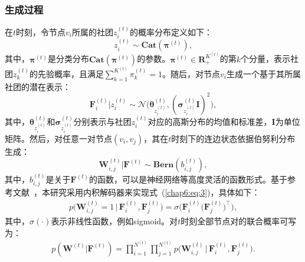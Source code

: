 \subsubsection{生成过程}


在$t$时刻，令节点$v_i$所属的社团$z_i^{(t)}$的概率分布定义如下：
\begin{equation}
z_i^{(t)} \sim \bm{Cat}(\bm{\pi}^{(t)}),
\label{eq:1}
\end{equation}
其中，$\bm{\pi}^{(t)}$是分类分布$\bm{Cat}(\bm{\pi}^{(t)})$的参数。$\bm{\pi}^{(t)} \in \boldsymbol{R}_{+}^{K^{(t)}}$的第$k$个分量，表示社团$z_k^{(t)}$的先验概率，且满足$\sum\nolimits_{k=1}^{K^{(t)}}{\pi_{k}^{(t)}}=1$。随后，对节点$v_i$生成一个基于其所属社团的潜在表示：
\begin{equation}
\mathbf{F}_i^{(t)} \Big| z_i^{(t)} \sim \bm{\mathcal{N}} \big(\bm{\theta}_{z_i^{(t)}}^{(t)}, (\bm{\sigma}_{z_i^{(t)}}^{(t)}\mathbf{I})^{2}\big),
\label{eq:2}
\end{equation}
其中，$\bm{\theta}_{z_i^{(t)}}^{(t)}$和$\bm{\sigma}_{z_i^{(t)}}^{(t)}$分别表示与社团$z_i^{(t)}$对应的高斯分布的均值和标准差，$\mathbf{I}$为单位矩阵。然后，对任意一对节点$(v_i,v_j)$，其在$t$时刻下的连边状态依据伯努利分布生成：
\begin{equation}
    \mathbf{W}^{(t)}_{i,j} \Big| \mathbf{F}^{(t)} \sim \bm{Bern}(b_{i,j}^{(t)}),
\label{chap6:eq:3}
\end{equation}
其中，$b_{i,j}^{(t)}$是关于$\mathbf{F}^{(t)}$的函数，可以是神经网络等高度灵活的函数形式。基于参考文献~\cite{mrabah2024contrastive}，本研究采用内积解码器来实现式~(\ref{chap6:eq:3})，具体如下：
\begin{align}
        p\big(\mathbf{W}^{(t)}_{i,j} =1 \,\big|\, \mathbf{F}_{i}^{(t)}, \mathbf{F}_{j}^{(t)}\big) 
        =  \sigma\Big(\mathbf{F}_{i}^{(t)}\big(\mathbf{F}_{j}^{(t)}\big)^{\top}\Big),
\label{eq:4}
\end{align}
其中，$\sigma(\cdot)$表示非线性函数，例如sigmoid。对$t$时刻全部节点对的联合概率可写为：
\begin{align}
        p(\mathbf{W}^{(t)} \big| \mathbf{F}^{(t)})  
        = \prod \limits_{i=1}^{N^{(t)}} \prod \limits_{j=1}^{N^{(t)}} p\big(\mathbf{W}_{i,j}^{(t)} \,\big|\, \mathbf{F}_{i}^{(t)}, \mathbf{F}_{j}^{(t)}\big).
\label{eq:5}
\end{align}

